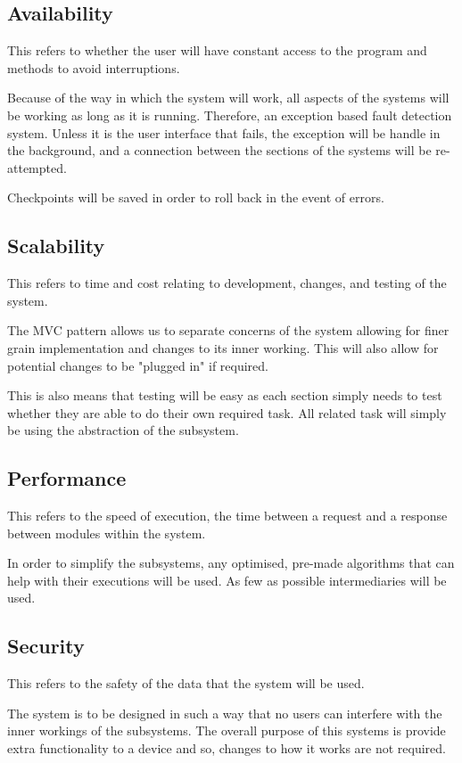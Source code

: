 \subsection{Availability}
This refers to whether the user will have constant access to the program and methods to avoid interruptions.

Because of the way in which the system will work, all aspects of the systems will be working as long as it is running. Therefore, an exception based fault detection system. Unless it is the user interface that fails, the exception will be handle in the background, and a connection between the sections of the systems will be re-attempted.

Checkpoints will be saved in order to roll back in the event of errors.

\subsection{Scalability}
This refers to time and cost relating to development, changes, and testing of the system.

The MVC pattern allows us to separate concerns of the system allowing for finer grain implementation and changes to its inner working. This will also allow for potential changes to be "plugged in" if required.

This is also means that testing will be easy as each section simply needs to test whether they are able to do their own required task. All related task will simply be using the abstraction of the subsystem.

\subsection{Performance}
This refers to the speed of execution, the time between a request and a response between modules within the system.

In order to simplify the subsystems, any optimised, pre-made algorithms that can help with their executions will be used. As few as possible intermediaries will be used.

\subsection{Security}
This refers to the safety of the data that the system will be used.

The system is to be designed in such a way that no users can interfere with the inner workings of the subsystems. The overall purpose of this systems is provide extra functionality to a device and so, changes to how it works are not required.


